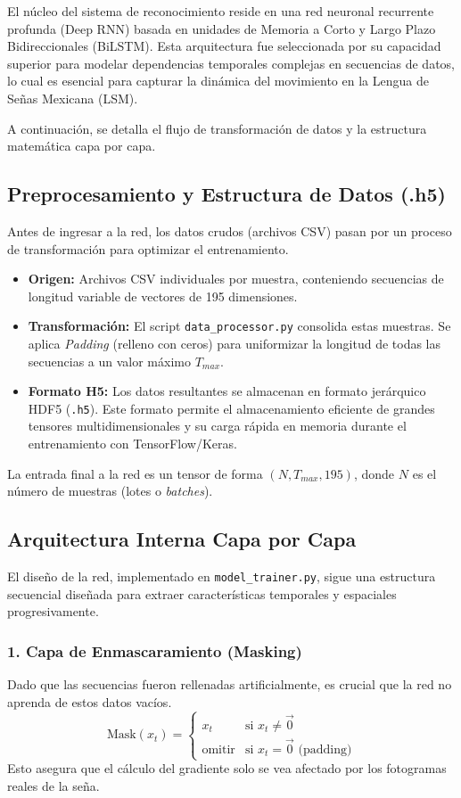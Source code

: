 El núcleo del sistema de reconocimiento reside en una red neuronal recurrente profunda (Deep RNN) basada en unidades de Memoria a Corto y Largo Plazo Bidireccionales (BiLSTM). Esta arquitectura fue seleccionada por su capacidad superior para modelar dependencias temporales complejas en secuencias de datos, lo cual es esencial para capturar la dinámica del movimiento en la Lengua de Señas Mexicana (LSM).

A continuación, se detalla el flujo de transformación de datos y la estructura matemática capa por capa.

\subsection{Preprocesamiento y Estructura de Datos (.h5)}

Antes de ingresar a la red, los datos crudos (archivos CSV) pasan por un proceso de transformación para optimizar el entrenamiento.

\begin{itemize}
    \item \textbf{Origen:} Archivos CSV individuales por muestra, conteniendo secuencias de longitud variable de vectores de 195 dimensiones.
    \item \textbf{Transformación:} El script \texttt{data\_processor.py} consolida estas muestras. Se aplica \textit{Padding} (relleno con ceros) para uniformizar la longitud de todas las secuencias a un valor máximo $T_{max}$.
    \item \textbf{Formato H5:} Los datos resultantes se almacenan en formato jerárquico HDF5 (\texttt{.h5}). Este formato permite el almacenamiento eficiente de grandes tensores multidimensionales y su carga rápida en memoria durante el entrenamiento con TensorFlow/Keras.
\end{itemize}

La entrada final a la red es un tensor de forma $(N, T_{max}, 195)$, donde $N$ es el número de muestras (lotes o \textit{batches}).

\subsection{Arquitectura Interna Capa por Capa}

El diseño de la red, implementado en \texttt{model\_trainer.py}, sigue una estructura secuencial diseñada para extraer características temporales y espaciales progresivamente.

\subsubsection{1. Capa de Enmascaramiento (Masking)}
Dado que las secuencias fueron rellenadas artificialmente, es crucial que la red no aprenda de estos datos vacíos.
\[
    \text{Mask}(x_t) =
    \begin{cases}
        x_t & \text{si } x_t \neq \vec{0} \\
        \text{omitir} & \text{si } x_t = \vec{0} \text{ (padding)}
    \end{cases}
\]
Esto asegura que el cálculo del gradiente solo se vea afectado por los fotogramas reales de la seña.

